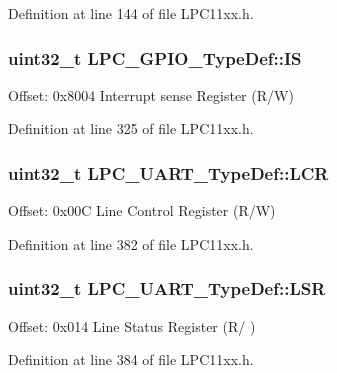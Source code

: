 Definition at line 144 of file L\+P\+C11xx.\+h.

\subsubsection[{\texorpdfstring{IS}{IS}}]{ uint32\+\_\+t L\+P\+C\+\_\+\+G\+P\+I\+O\+\_\+\+Type\+Def\+::\+IS}\hypertarget{group___l_p_c11xx___definitions_gaa61b4d1fa9ec8608bc0d34e094e9a605}{}\label{group___l_p_c11xx___definitions_gaa61b4d1fa9ec8608bc0d34e094e9a605}
Offset\+: 0x8004 Interrupt sense Register (R/W) 

Definition at line 325 of file L\+P\+C11xx.\+h.

\subsubsection[{\texorpdfstring{L\+CR}{LCR}}]{ uint32\+\_\+t L\+P\+C\+\_\+\+U\+A\+R\+T\+\_\+\+Type\+Def\+::\+L\+CR}\hypertarget{group___l_p_c11xx___definitions_gac260406af632c312e34268a20d63d9cf}{}\label{group___l_p_c11xx___definitions_gac260406af632c312e34268a20d63d9cf}
Offset\+: 0x00C Line Control Register (R/W) 

Definition at line 382 of file L\+P\+C11xx.\+h.

\subsubsection[{\texorpdfstring{L\+SR}{LSR}}]{ uint32\+\_\+t L\+P\+C\+\_\+\+U\+A\+R\+T\+\_\+\+Type\+Def\+::\+L\+SR}\hypertarget{group___l_p_c11xx___definitions_ga8a31a0104195ed9168c0d228802b5210}{}\label{group___l_p_c11xx___definitions_ga8a31a0104195ed9168c0d228802b5210}
Offset\+: 0x014 Line Status Register (R/ ) 

Definition at line 384 of file L\+P\+C11xx.\+h.

